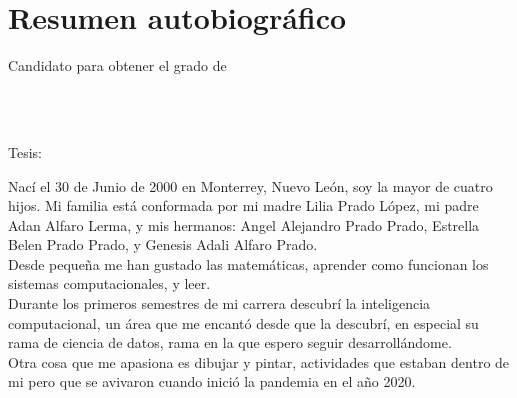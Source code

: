 
\chapter*{Resumen autobiográfico}
\thispagestyle{empty}

\begin{center}
\autor

Candidato para obtener el grado de\\
\grado\\
\orientacion\bigskip

\uanl\\
\fime\bigskip

Tesis:\\
\textsc{\large\titulo}
\end{center}\bigskip

Nací el 30 de Junio de 2000 en Monterrey, Nuevo León, soy la mayor de cuatro hijos. Mi familia está conformada por mi madre Lilia Prado López, mi padre Adan Alfaro Lerma, y mis hermanos: Angel Alejandro Prado Prado, Estrella Belen Prado Prado, y Genesis Adali Alfaro Prado. \\
Desde pequeña me han gustado las matemáticas, aprender como funcionan los sistemas computacionales, y leer. \\
Durante los primeros semestres de mi carrera descubrí la inteligencia computacional, un área que me encantó desde que la descubrí, en especial su rama de ciencia de datos, rama en la que espero seguir desarrollándome. \\
Otra cosa que me apasiona es dibujar y pintar, actividades que estaban dentro de mi pero que se avivaron cuando inició la pandemia en el año 2020.
